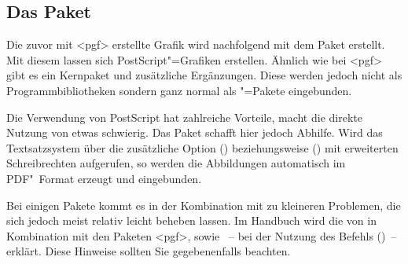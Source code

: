 \documentclass[%
  english,ngerman,%
  cdgeometry=no,DIV=12,%
  cd=false,cdfont=false,cdtitle=true,%
  headings=normal,%
  automark,%
  listof=toc,%
]{tudscrartcl}
\begin{document}
\subsection{Das Paket }
Die zuvor mit <pgf> erstellte Grafik wird nachfolgend mit dem 
Paket  erstellt. Mit diesem lassen sich PostScript"=Grafiken 
erstellen. Ähnlich wie bei <pgf> gibt es ein Kernpaket und 
zusätzliche Ergänzungen. Diese werden jedoch nicht als Programmbibliotheken 
sondern ganz normal als "=Pakete eingebunden.
%
\begin{Hint}
\usepackage{pstricks,pst-node}
\end{Hint}
%
Die Verwendung von PostScript hat zahlreiche Vorteile, macht die direkte 
Nutzung von  etwas schwierig. Das Paket  
schafft hier jedoch Abhilfe. Wird das Textsatzsystem  über die 
zusätzliche Option () beziehungsweise 
() mit erweiterten Schreibrechten 
aufgerufen, so werden die Abbildungen automatisch im PDF"~Format erzeugt und 
eingebunden.
%
\begin{Hint}
\usepackage{auto-pst-pdf}
\end{Hint}
%
Bei einigen Pakete kommt es in der Kombination mit  zu 
kleineren Problemen, die sich jedoch meist relativ leicht beheben lassen. Im 
Handbuch wird die  
von  in Kombination mit den Paketen <pgf>, 
 sowie ~-- bei der Nutzung des Befehls 
()~-- erklärt. Diese Hinweise sollten Sie 
gegebenenfalls beachten.
\end{document}
